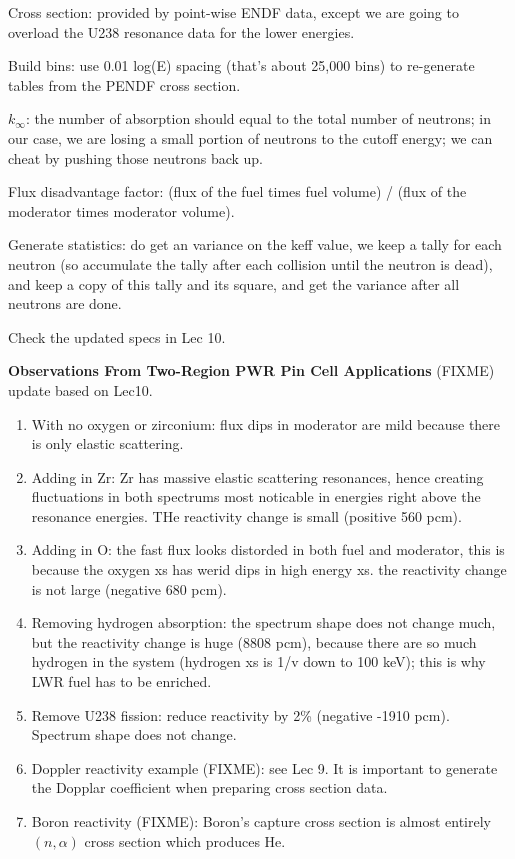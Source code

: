 \documentclass{school-22.211-notes}
\date{March  7, 2012}
\begin{document}
\maketitle

Cross section: provided by point-wise ENDF data, except we are going to overload the U238 resonance data for the lower energies.

Build bins: use 0.01 log(E) spacing (that's about 25,000 bins) to re-generate tables from the PENDF cross section. 

$k_{\infty}$: the number of absorption should equal to the total number of neutrons; in our case, we are losing a small portion of neutrons to the cutoff energy; we can cheat by pushing those neutrons back up. 

Flux disadvantage factor: (flux of the fuel times fuel volume) / (flux of the moderator times moderator volume). 

Generate statistics: do get an variance on the keff value, we keep a tally for each neutron (so accumulate the tally after each collision until the neutron is dead), and keep a copy of this tally and its square, and get the variance after all neutrons are done. 

Check the updated specs in Lec 10. 


\textbf{Observations From Two-Region PWR Pin Cell Applications}
(FIXME) update based on Lec10. 
\begin{enumerate}
\item With no oxygen or zirconium: flux dips in moderator are mild because there is only elastic scattering. 
\item Adding in Zr: Zr has massive elastic scattering resonances, hence creating fluctuations in both spectrums most noticable in energies right above the resonance energies. THe reactivity change is small (positive 560 pcm).
\item Adding in O: the fast flux looks distorded in both fuel and moderator, this is because the oxygen xs has werid dips in high energy xs. the reactivity change is not large (negative 680 pcm). 
\item Removing hydrogen absorption: the spectrum shape does not change much, but the reactivity change is huge (8808 pcm), because there are so much hydrogen in the system (hydrogen xs is 1/v down to 100 keV); this is why LWR fuel has to be enriched. 
\item Remove U238 fission: reduce reactivity by 2\% (negative -1910 pcm). Spectrum shape does not change. 
\item Doppler reactivity example (FIXME): see Lec 9. It is important to generate the Dopplar coefficient when preparing cross section data. 
\item Boron reactivity (FIXME): Boron's capture cross section is almost entirely $(n,\alpha)$ cross section which produces He. 
\end{enumerate}
\end{document}
